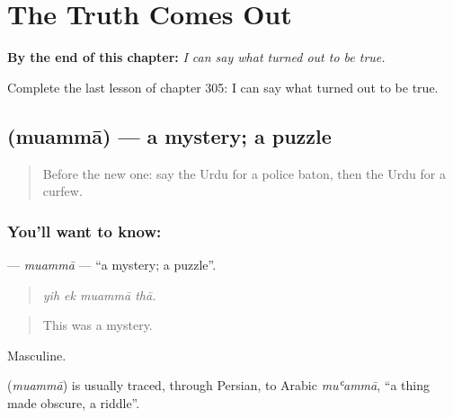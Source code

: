 
\chapter{The Truth Comes Out}
\label{ch:ur-the-truth-comes-out}

\begin{chapteropening}
\textbf{By the end of this chapter:} \emph{I can say what turned out to be true.}

Complete the last lesson of chapter 305: I can say what turned out to be true.
\end{chapteropening}

\section[\texorpdfstring{\ur{معمہ} (muammā)}{معمہ (muammā)}]{ (muammā) — a mystery; a puzzle}

\label{lesson:UR-C305-muamma}



\begin{quote}
Before the new one: say the Urdu for a police baton, then the Urdu for a curfew.
\end{quote}

\subsection*{You'll want to know: }
\textbf{} — \emph{muammā} — \textquotedblleft{}a mystery; a puzzle\textquotedblright{}.

\begin{quote}
   
\end{quote}

\begin{quote}
\emph{yih ek muammā thā.}
\end{quote}

\begin{quote}
This was a mystery.
\end{quote}

Masculine.

\begin{cousinweb}
\textbf{} (\emph{muammā}) is usually traced, through Persian, to Arabic \emph{muʿammā}, \textquotedblleft{}a thing made obscure, a riddle\textquotedblright{}.
\end{cousinweb}

